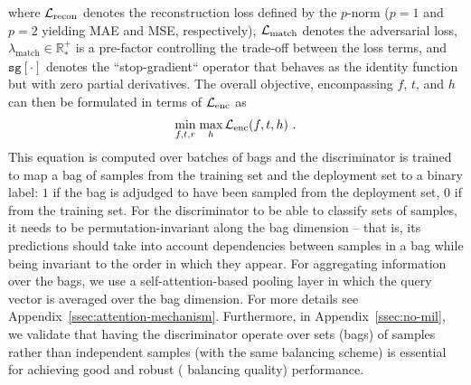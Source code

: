 %
where \( {\mathcal{L}}_{\text{recon}} \) denotes the reconstruction loss defined by the \(p\)-norm (\(p=1\)
and \(p=2\) yielding MAE and MSE, respectively), \( {\mathcal{L}}_\text{match} \) denotes the adversarial loss,
\( \lambda_\text{match} \in \mathbb{R}^+_\ast \) is a pre-factor controlling the trade-off between
the loss terms, and \( \texttt{sg}[\cdot] \) denotes the ``stop-gradient`` operator that behaves as
the identity function but with zero partial derivatives.
%
The overall objective, encompassing $f$, $t$, and $h$ can then be formulated in terms of
\( {\mathcal{L}}_\text{enc} \) as
%
\begin{align}
    \underset{f, t, r}{\textrm{min}}\; \underset{h}{\textrm{max}}\,{\mathcal{L}}_\text{enc}(f, t, h)~.
    \label{eq:disentangling_total}
\end{align}
%
This equation is computed over batches of bags and the discriminator is trained to map a bag of
samples from the training set and the deployment set to a binary label: $1$ if the bag is adjudged to
have been sampled from the deployment set, $0$ if from the training set.
For the discriminator to be able to classify sets of samples, it needs to be permutation-invariant
along the bag dimension -- that is, its predictions should take into account dependencies between
samples in a bag while being invariant to the order in which they appear. 
For aggregating information over the bags, we use a self-attention-based
\citep{vaswani2017attention} pooling layer in which the query vector is averaged over the bag
dimension.
For more details see Appendix~\ref{ssec:attention-mechanism}. 
Furthermore, in Appendix~\ref{ssec:no-mil}, we
validate that having the discriminator operate over sets (bags) of samples rather than independent samples
(with the same balancing scheme) is essential for achieving good and robust (\wrt{} balancing quality)
performance.

